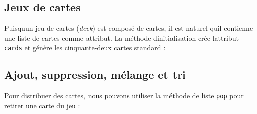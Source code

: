 \hypertarget{jeux-de-cartes}{%
\subsection{Jeux de cartes}\label{jeux-de-cartes}}

Puisqu\textquotesingle un jeu de cartes (\emph{deck}) est composé de
cartes, il est naturel qu\textquotesingle il contienne une liste de
cartes comme attribut. La méthode d\textquotesingle initialisation crée
l\textquotesingle attribut \texttt{cards} et génère les cinquante-deux
cartes standard :

\begin{Shaded}
\begin{Highlighting}[]
\NormalTok{):}

     \NormalTok{(}\NormalTok{):}
        \OperatorTok{=}\NormalTok{ []}
         \NormalTok{(}\NormalTok{):}
             \NormalTok{(}\NormalTok{, }\NormalTok{):}
\OperatorTok{=}
\end{Highlighting}
\end{Shaded}

\hypertarget{ajout-suppression-muxe9lange-et-tri}{%
\subsection{Ajout, suppression, mélange et
tri}\label{ajout-suppression-muxe9lange-et-tri}}

Pour distribuer des cartes, nous pouvons utiliser la méthode de liste
\texttt{pop} pour retirer une carte du jeu :

\begin{Shaded}
\begin{Highlighting}[]


\NormalTok{):}
     
\end{Highlighting}
\end{Shaded}


